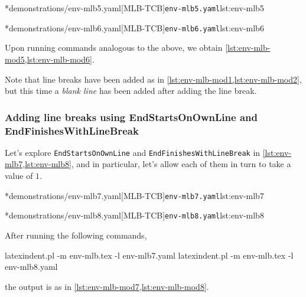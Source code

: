 	\begin{minipage}{.45\textwidth}
		\cmhlistingsfromfile[style=yaml-LST]*{demonstrations/env-mlb5.yaml}[MLB-TCB]{\texttt{env-mlb5.yaml}}{lst:env-mlb5}
	\end{minipage}
	\hfill
	\begin{minipage}{.45\textwidth}
		\cmhlistingsfromfile[style=yaml-LST]*{demonstrations/env-mlb6.yaml}[MLB-TCB]{\texttt{env-mlb6.yaml}}{lst:env-mlb6}
	\end{minipage}

	Upon running  commands analogous to the above, we obtain \cref{lst:env-mlb-mod5,lst:env-mlb-mod6}.

	\begin{widepage}
		\begin{minipage}{.56\linewidth}
		\end{minipage}
		\hfill
		\begin{minipage}{.43\linewidth}
		\end{minipage}
	\end{widepage}

	Note that line breaks have been added as in \cref{lst:env-mlb-mod1,lst:env-mlb-mod2}, but this time a \emph{blank line} has been added after adding the line break.

\subsubsection{Adding line breaks using EndStartsOnOwnLine and EndFinishesWithLineBreak}
	Let's explore \texttt{EndStartsOnOwnLine} and \texttt{EndFinishesWithLineBreak} in \cref{lst:env-mlb7,lst:env-mlb8}, and in particular, let's allow each of them in turn to take a value of $1$.

	\begin{minipage}{.49\textwidth}
		\cmhlistingsfromfile[style=yaml-LST]*{demonstrations/env-mlb7.yaml}[MLB-TCB]{\texttt{env-mlb7.yaml}}{lst:env-mlb7}
	\end{minipage}
	\hfill
	\begin{minipage}{.49\textwidth}
		\cmhlistingsfromfile[style=yaml-LST]*{demonstrations/env-mlb8.yaml}[MLB-TCB]{\texttt{env-mlb8.yaml}}{lst:env-mlb8}
	\end{minipage}

	After running the following commands, \begin{commandshell}
latexindent.pl -m env-mlb.tex -l env-mlb7.yaml
latexindent.pl -m env-mlb.tex -l env-mlb8.yaml
\end{commandshell} the output is as in \cref{lst:env-mlb-mod7,lst:env-mlb-mod8}.

